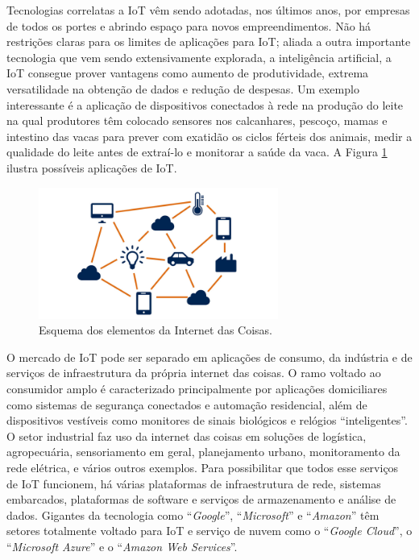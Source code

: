 Tecnologias correlatas a \ac{IoT} vêm sendo adotadas, nos últimos anos, por empresas de todos os portes e abrindo espaço para novos empreendimentos. Não há restrições claras para os limites de aplicações para \ac{IoT}; aliada a outra importante tecnologia que vem sendo extensivamente explorada, a inteligência artificial, a \ac{IoT} consegue prover vantagens como aumento de produtividade, extrema versatilidade na obtenção de dados e redução de despesas. Um exemplo interessante é a aplicação de dispositivos conectados à rede na produção do leite \cite{milk} na qual produtores têm colocado sensores nos calcanhares, pescoço, mamas e intestino das vacas para prever com exatidão os ciclos férteis dos animais, medir a qualidade do leite antes de extraí-lo e monitorar a saúde da vaca. A Figura \ref{iot} ilustra possíveis aplicações de IoT.

\begin{figure}[ht]
    \begin{center}
    \includegraphics[width=0.7\textwidth]{figuras/iot}
    \end{center}
    \caption[Esquema dos elementos da Internet das Coisas.]{Esquema dos elementos da Internet das Coisas.}
    \label{iot}
\end{figure}

O mercado de \ac{IoT} pode ser separado em aplicações de consumo, da indústria e de serviços de infraestrutura da própria internet das coisas. O ramo voltado ao consumidor amplo é caracterizado principalmente por aplicações domiciliares como sistemas de segurança conectados e automação residencial, além de dispositivos vestíveis como monitores de sinais biológicos e relógios “inteligentes”. O setor industrial faz uso da internet das coisas em soluções de logística, agropecuária, sensoriamento em geral, planejamento urbano, monitoramento da rede elétrica, e vários outros exemplos. Para possibilitar que todos esse serviços de \ac{IoT} funcionem, há várias plataformas de infraestrutura de rede, sistemas embarcados, plataformas de software e serviços de armazenamento e análise de dados. Gigantes da tecnologia como “\textit{Google}”, “\textit{Microsoft}” e “\textit{Amazon}” têm setores totalmente voltado para \ac{IoT} e serviço de nuvem como o “\textit{Google Cloud}”, o “\textit{Microsoft Azure}” e o “\textit{Amazon Web Services}”.

